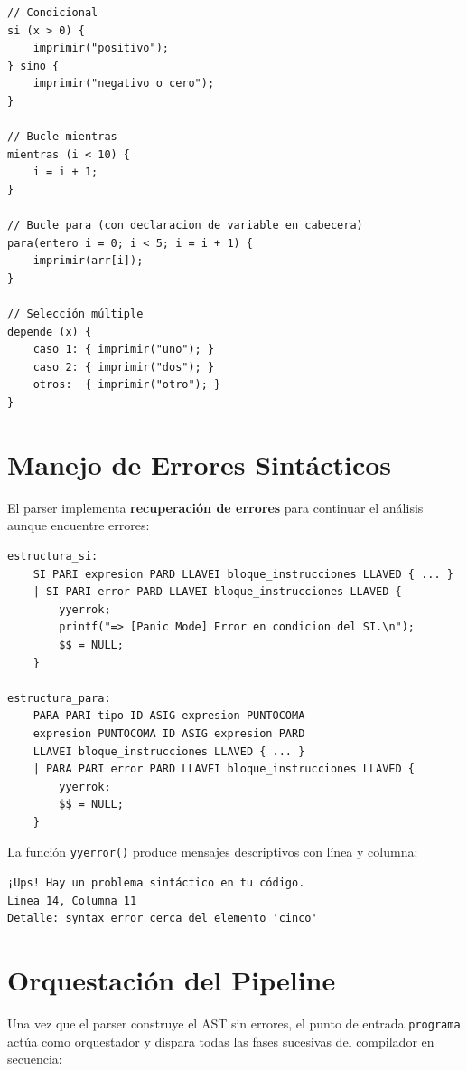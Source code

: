 \begin{lstlisting}[style=tppstyle, caption={Estructuras de control disponibles}]
// Condicional
si (x > 0) {
    imprimir("positivo");
} sino {
    imprimir("negativo o cero");
}

// Bucle mientras
mientras (i < 10) {
    i = i + 1;
}

// Bucle para (con declaracion de variable en cabecera)
para(entero i = 0; i < 5; i = i + 1) {
    imprimir(arr[i]);
}

// Selección múltiple
depende (x) {
    caso 1: { imprimir("uno"); }
    caso 2: { imprimir("dos"); }
    otros:  { imprimir("otro"); }
}
\end{lstlisting}

\section{Manejo de Errores Sintácticos}

El parser implementa \textbf{recuperación de errores} para continuar el análisis aunque encuentre errores:

\begin{lstlisting}[style=cstyle, caption={Recuperación de errores en el parser}]
estructura_si:
    SI PARI expresion PARD LLAVEI bloque_instrucciones LLAVED { ... }
    | SI PARI error PARD LLAVEI bloque_instrucciones LLAVED {
        yyerrok;
        printf("=> [Panic Mode] Error en condicion del SI.\n");
        $$ = NULL;
    }

estructura_para:
    PARA PARI tipo ID ASIG expresion PUNTOCOMA 
    expresion PUNTOCOMA ID ASIG expresion PARD 
    LLAVEI bloque_instrucciones LLAVED { ... }
    | PARA PARI error PARD LLAVEI bloque_instrucciones LLAVED {
        yyerrok;
        $$ = NULL;
    }
\end{lstlisting}

La función \texttt{yyerror()} produce mensajes descriptivos con línea y columna:

\begin{verbatim}
¡Ups! Hay un problema sintáctico en tu código.
Linea 14, Columna 11
Detalle: syntax error cerca del elemento 'cinco'
\end{verbatim}

\section{Orquestación del Pipeline}

Una vez que el parser construye el AST sin errores, el punto de entrada \texttt{programa} actúa como orquestador y dispara todas las fases sucesivas del compilador en secuencia:

